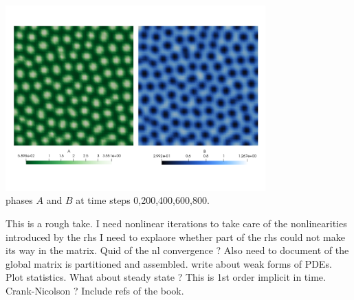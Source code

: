 \begin{center}
\includegraphics[width=10cm]{python_codes/fieldstone_130/results/AB_800}\\
{\captionfont phases $A$ and $B$ at time steps 0,200,400,600,800.}
\end{center}


This is a rough take.
I need nonlinear iterations to take care of the nonlinearities introduced by the rhs
I need to explaore whether part of the rhs could not make its way in the matrix. 
Quid of the nl convergence ?
Also need to document of the global matrix is partitioned and assembled.
write about weak forms of PDEs.
Plot statistics. What about steady state ?
This is 1st order implicit in time. Crank-Nicolson ?
Include refs of the book. 
